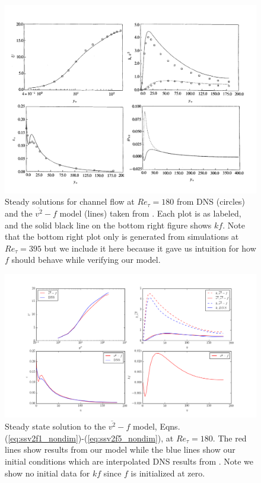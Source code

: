 \documentclass[a4paper,11pt]{article}
\begin{document}
\begin{figure}
 \centering
 \includegraphics[width=\textwidth]{durbin180}
 \caption{Steady solutions for channel flow at $Re_\tau=180$ from DNS (circles)
and the $\overline{v^2}-f$ model (lines) taken from \cite{durbin180}. Each plot
is as labeled, and the solid black line on the bottom right figure shows $kf$.
Note that the bottom right plot only is generated from simulations at $Re_\tau =
395$ but we include it here because it gave us intuition for how $f$ should
behave while verifying our model.}
 \label{fig:durbin180}
\end{figure}

\begin{figure}
 \centering
 \includegraphics[width=\textwidth]{results_180}
 \caption{Steady state solution to the $\overline{v^2}-f$ model, Eqns.
(\ref{eq:ssv2f1_nondim})-(\ref{eq:ssv2f5_nondim}), at $Re_\tau=180$. The red
lines show results from our model while the blue lines show our
initial conditions which are interpolated DNS results from \cite{Lee}. Note we
show no initial data for $kf$ since $f$ is initialized at zero.}
 \label{fig:results_180}
\end{figure}
\end{document}
